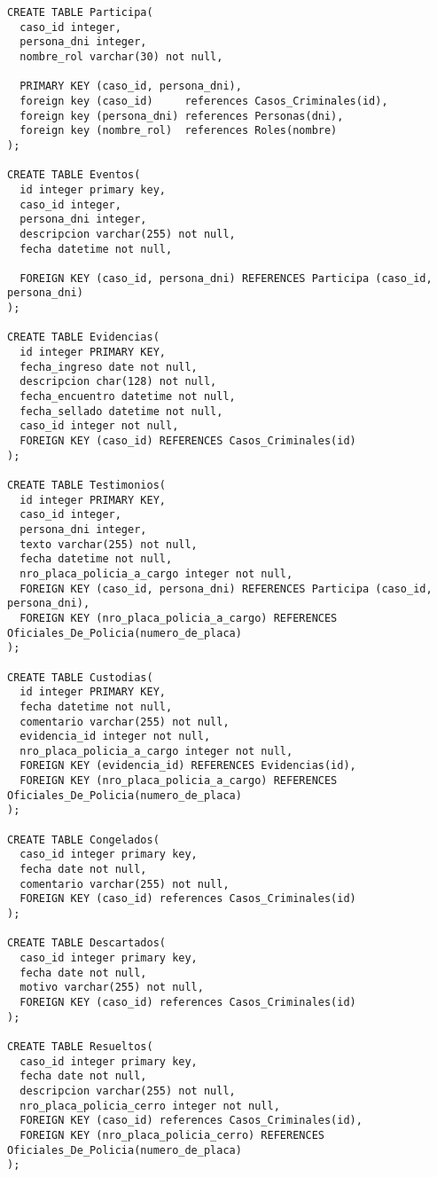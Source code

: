 \documentclass[10pt,a4paper]{article}
\begin{document}
\begin{verbatim}
CREATE TABLE Participa(
  caso_id integer,
  persona_dni integer,
  nombre_rol varchar(30) not null,

  PRIMARY KEY (caso_id, persona_dni),
  foreign key (caso_id)     references Casos_Criminales(id),
  foreign key (persona_dni) references Personas(dni),
  foreign key (nombre_rol)  references Roles(nombre)
);

CREATE TABLE Eventos(
  id integer primary key,
  caso_id integer,
  persona_dni integer,
  descripcion varchar(255) not null,
  fecha datetime not null,

  FOREIGN KEY (caso_id, persona_dni) REFERENCES Participa (caso_id, persona_dni)
);

CREATE TABLE Evidencias(
  id integer PRIMARY KEY,
  fecha_ingreso date not null,
  descripcion char(128) not null,
  fecha_encuentro datetime not null,
  fecha_sellado datetime not null,
  caso_id integer not null,
  FOREIGN KEY (caso_id) REFERENCES Casos_Criminales(id)
);

CREATE TABLE Testimonios(
  id integer PRIMARY KEY,
  caso_id integer,
  persona_dni integer,
  texto varchar(255) not null,
  fecha datetime not null,
  nro_placa_policia_a_cargo integer not null,
  FOREIGN KEY (caso_id, persona_dni) REFERENCES Participa (caso_id, persona_dni),
  FOREIGN KEY (nro_placa_policia_a_cargo) REFERENCES Oficiales_De_Policia(numero_de_placa)
);

CREATE TABLE Custodias(
  id integer PRIMARY KEY,
  fecha datetime not null,
  comentario varchar(255) not null,
  evidencia_id integer not null,
  nro_placa_policia_a_cargo integer not null,
  FOREIGN KEY (evidencia_id) REFERENCES Evidencias(id),
  FOREIGN KEY (nro_placa_policia_a_cargo) REFERENCES Oficiales_De_Policia(numero_de_placa)
);

CREATE TABLE Congelados(
  caso_id integer primary key,
  fecha date not null,
  comentario varchar(255) not null,
  FOREIGN KEY (caso_id) references Casos_Criminales(id)
);

CREATE TABLE Descartados(
  caso_id integer primary key,
  fecha date not null,
  motivo varchar(255) not null,
  FOREIGN KEY (caso_id) references Casos_Criminales(id)
);

CREATE TABLE Resueltos(
  caso_id integer primary key,
  fecha date not null,
  descripcion varchar(255) not null,
  nro_placa_policia_cerro integer not null,
  FOREIGN KEY (caso_id) references Casos_Criminales(id),
  FOREIGN KEY (nro_placa_policia_cerro) REFERENCES Oficiales_De_Policia(numero_de_placa)
);


\end{verbatim}
\end{document}
